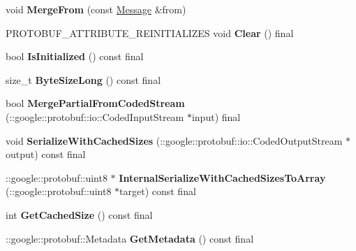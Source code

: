 \begin{DoxyCompactItemize}
\item 
\mbox{\label{classtbMessages_1_1Message_a11e09e162c6e9944185a36b36e2942ec}} 
void {\bfseries Merge\+From} (const \hyperlink{classtbMessages_1_1Message}{Message} \&from)
\item 
\mbox{\label{classtbMessages_1_1Message_a7f0666c5d0c39da5756606c0c43d0848}} 
P\+R\+O\+T\+O\+B\+U\+F\+\_\+\+A\+T\+T\+R\+I\+B\+U\+T\+E\+\_\+\+R\+E\+I\+N\+I\+T\+I\+A\+L\+I\+Z\+ES void {\bfseries Clear} () final
\item 
\mbox{\label{classtbMessages_1_1Message_a9d715cf0b9e8dba18607c7beed09b92f}} 
bool {\bfseries Is\+Initialized} () const final
\item 
\mbox{\label{classtbMessages_1_1Message_a94aac0e49243e831546a4b1c348f88ac}} 
size\+\_\+t {\bfseries Byte\+Size\+Long} () const final
\item 
\mbox{\label{classtbMessages_1_1Message_a534b71ab52eadf15029fb378d2c3e4dd}} 
bool {\bfseries Merge\+Partial\+From\+Coded\+Stream} (\+::google\+::protobuf\+::io\+::\+Coded\+Input\+Stream $\ast$input) final
\item 
\mbox{\label{classtbMessages_1_1Message_affc6a54493e2df63cb08c156c373e0fa}} 
void {\bfseries Serialize\+With\+Cached\+Sizes} (\+::google\+::protobuf\+::io\+::\+Coded\+Output\+Stream $\ast$output) const final
\item 
\mbox{\label{classtbMessages_1_1Message_a2b572a4350654d0d60d727f4e33312aa}} 
\+::google\+::protobuf\+::uint8 $\ast$ {\bfseries Internal\+Serialize\+With\+Cached\+Sizes\+To\+Array} (\+::google\+::protobuf\+::uint8 $\ast$target) const final
\item 
\mbox{\label{classtbMessages_1_1Message_a4305cad6e15d7c3535501a1bfe319ab1}} 
int {\bfseries Get\+Cached\+Size} () const final
\item 
\mbox{\label{classtbMessages_1_1Message_a7e4225ad1d48fe1764fd39ab648f92de}} 
\+::google\+::protobuf\+::\+Metadata {\bfseries Get\+Metadata} () const final

\end{DoxyCompactItemize}
